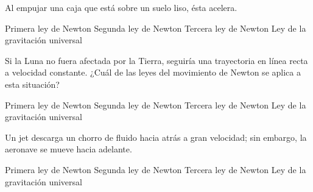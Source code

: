 \begin{parts}
    Al empujar una caja que está sobre un suelo liso, ésta acelera.

    \begin{choices}
        \choice Primera ley de Newton
        \choice Segunda ley de Newton
        \choice Tercera ley de Newton
        \choice Ley de la gravitación universal
    \end{choices}



    Si la Luna no fuera afectada por la Tierra, seguiría una trayectoria en línea recta a velocidad constante. ¿Cuál de las leyes del movimiento de Newton se aplica a esta situación?

    \begin{choices}
        \choice Primera ley de Newton
        \choice Segunda ley de Newton
        \choice Tercera ley de Newton
        \choice Ley de la gravitación universal
    \end{choices}

    Un jet descarga un chorro de fluido hacia atrás a gran velocidad; sin embargo, la aeronave se mueve hacia adelante.

    \begin{choices}
        \choice Primera ley de Newton
        \choice Segunda ley de Newton
        \choice Tercera ley de Newton
        \choice Ley de la gravitación universal
    \end{choices}

\end{parts}